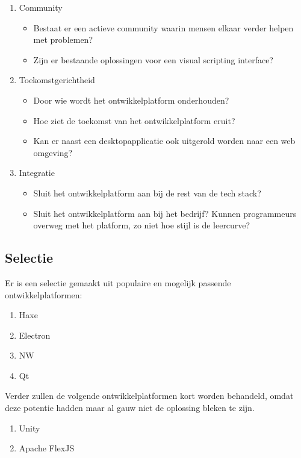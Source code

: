 \begin{enumerate}
    \item Community
    \begin{itemize}
        \item Bestaat er een actieve community waarin mensen elkaar verder helpen met problemen?
        \item Zijn er bestaande oplossingen voor een visual scripting interface?
    \end{itemize}    
    \item Toekomstgerichtheid
    \begin{itemize}
        \item Door wie wordt het ontwikkelplatform onderhouden?
        \item Hoe ziet de toekomst van het ontwikkelplatform eruit?
        \item Kan er naast een desktopapplicatie ook uitgerold worden naar een web omgeving?
    \end{itemize}
    \item Integratie
    \begin{itemize}
        \item Sluit het ontwikkelplatform aan bij de rest van de tech stack?
        \item Sluit het ontwikkelplatform aan bij het bedrijf? Kunnen programmeurs overweg met het platform, zo niet hoe stijl is de leercurve?
    \end{itemize}
\end{enumerate}

\subsection{Selectie}
Er is een selectie gemaakt uit populaire en mogelijk passende ontwikkelplatformen:
\begin{enumerate}
    \item Haxe
    \item Electron
    \item NW
    \item Qt    
\end{enumerate}

\noindent Verder zullen de volgende ontwikkelplatformen kort worden behandeld, omdat deze potentie hadden maar al gauw niet de oplossing bleken te zijn.
\begin{enumerate}
    \item Unity
    \item Apache FlexJS
\end{enumerate}

